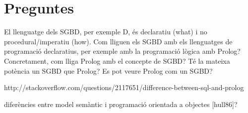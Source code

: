 \section{Preguntes}

El llenguatge dels SGBD, per exemple D, és declaratiu (what) i no procedural/imperatiu (how). Com lliguen els SGBD amb els llenguatges de programació declaratius, per exemple amb la programació lògica amb Prolog? Concretament, com lliga Prolog amb el concepte de SGBD? Té la mateixa potència un SGBD que Prolog?
 Es pot veure Prolog com un SGBD?

http://stackoverflow.com/questions/2117651/difference-between-sql-and-prolog

diferències entre model semàntic i programació orientada a objectes [hull86]?




